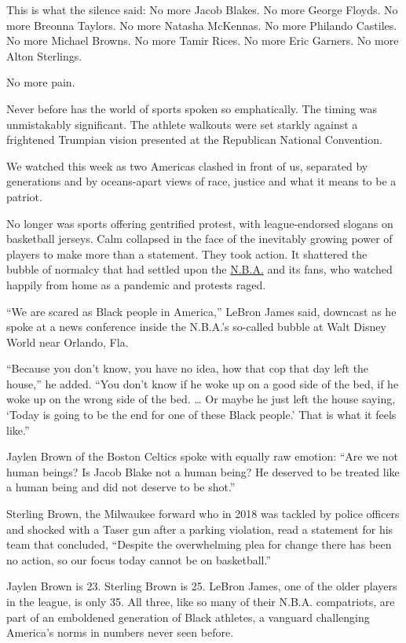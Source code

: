 This is what the silence said: No more Jacob Blakes. No more George
Floyds. No more Breonna Taylors. No more Natasha McKennas. No more
Philando Castiles. No more Michael Browns. No more Tamir Rices. No more
Eric Garners. No more Alton Sterlings.

No more pain.

Never before has the world of sports spoken so emphatically. The timing
was unmistakably significant. The athlete walkouts were set starkly
against a frightened Trumpian vision presented at the Republican
National Convention.

We watched this week as two Americas clashed in front of us, separated
by generations and by oceans-apart views of race, justice and what it
means to be a patriot.

No longer was sports offering gentrified protest, with league-endorsed
slogans on basketball jerseys. Calm collapsed in the face of the
inevitably growing power of players to make more than a statement. They
took action. It shattered the bubble of normalcy that had settled upon
the
\href{https://www.nytimes3xbfgragh.onion/2020/08/28/sports/basketball/nba-playoffs-resume.html}{N.B.A.}
and its fans, who watched happily from home as a pandemic and protests
raged.

``We are scared as Black people in America,'' LeBron James said,
downcast as he spoke at a news conference inside the N.B.A.'s so-called
bubble at Walt Disney World near Orlando, Fla.

``Because you don't know, you have no idea, how that cop that day left
the house,'' he added. ``You don't know if he woke up on a good side of
the bed, if he woke up on the wrong side of the bed. \ldots{} Or maybe
he just left the house saying, `Today is going to be the end for one of
these Black people.' That is what it feels like.''

Jaylen Brown of the Boston Celtics spoke with equally raw emotion: ``Are
we not human beings? Is Jacob Blake not a human being? He deserved to be
treated like a human being and did not deserve to be shot.''

Sterling Brown, the Milwaukee forward who in 2018 was tackled by police
officers and shocked with a Taser gun after a parking violation, read a
statement for his team that concluded, ``Despite the overwhelming plea
for change there has been no action, so our focus today cannot be on
basketball.''

Jaylen Brown is 23. Sterling Brown is 25. LeBron James, one of the older
players in the league, is only 35. All three, like so many of their
N.B.A. compatriots, are part of an emboldened generation of Black
athletes, a vanguard challenging America's norms in numbers never seen
before.

